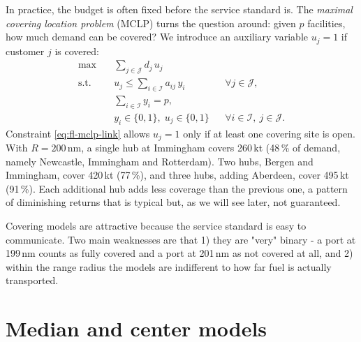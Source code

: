 In practice, the budget is often fixed before the service standard is. The \emph{maximal covering location problem} (MCLP) turns the question around: given $p$ facilities, how much demand can be covered? We introduce an auxiliary variable $u_j=1$ if customer $j$ is covered:
\begin{align}
  \max\quad & \sum_{j\in\mathcal{J}} d_j\, u_j \label{eq:fl-mclp-obj}\\
  \text{s.t.}\quad & u_j \le \sum_{i\in\mathcal{I}} a_{ij}\, y_i && \forall j\in\mathcal{J}, \label{eq:fl-mclp-link}\\
  & \sum_{i\in\mathcal{I}} y_i = p, \label{eq:fl-mclp-p}\\
  & y_i\in\{0,1\},\; u_j\in\{0,1\} && \forall i\in\mathcal{I},\ j\in\mathcal{J}. \nonumber
\end{align}
Constraint \eqref{eq:fl-mclp-link} allows $u_j=1$ only if at least one covering site is open. With $R=200$\,nm, a single hub at Immingham covers 260\,kt (48\,\% of demand, namely Newcastle, Immingham and Rotterdam). Two hubs, Bergen and Immingham, cover 420\,kt (77\,\%), and three hubs, adding Aberdeen, cover 495\,kt (91\,\%). Each additional hub adds less coverage than the previous one, a pattern of diminishing returns that is typical but, as we will see later, not guaranteed.

Covering models are attractive because the service standard is easy to communicate. Two main weaknesses are that 1) they are "very" binary - a port at 199\,nm counts as fully covered and a port at 201\,nm as not covered at all, and 2) within the range radius the models are indifferent to how far fuel is actually transported.


\section{Median and center models}
\label{sec:fl-median}

